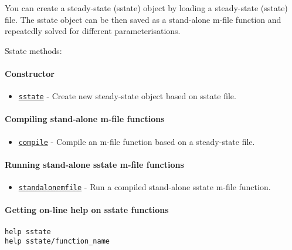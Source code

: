 

	You can create a steady-state (sstate) object by loading a steady-state
(sstate) file. The sstate object can be then saved as a stand-alone
m-file function and repeatedly solved for different parameterisations.

Sstate methods:

\paragraph{Constructor}\label{constructor}

\begin{itemize}
\itemsep1pt\parskip0pt
\item
  \href{sstate/sstate}{\texttt{sstate}} - Create new steady-state object
  based on sstate file.
\end{itemize}

\paragraph{Compiling stand-alone m-file
functions}\label{compiling-stand-alone-m-file-functions}

\begin{itemize}
\itemsep1pt\parskip0pt
\item
  \href{sstate/compile}{\texttt{compile}} - Compile an m-file function
  based on a steady-state file.
\end{itemize}

\paragraph{Running stand-alone sstate m-file
functions}\label{running-stand-alone-sstate-m-file-functions}

\begin{itemize}
\itemsep1pt\parskip0pt
\item
  \href{sstate/standalonemfile}{\texttt{standalonemfile}} - Run a
  compiled stand-alone sstate m-file function.
\end{itemize}

\paragraph{Getting on-line help on sstate
functions}\label{getting-on-line-help-on-sstate-functions}

\begin{verbatim}
help sstate
help sstate/function_name
\end{verbatim}



